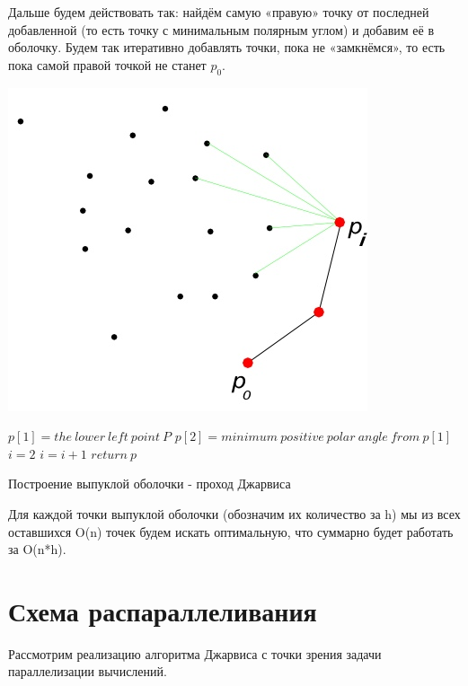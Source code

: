 \documentclass{report}
\newenvironment{myalgorithm}[1][htb]
{\renewcommand{\algorithmcfname}{Алгоритм}
\begin{algorithm}[#1]%
}{\end{algorithm}}
\begin{document}
\par Дальше будем действовать так: найдём самую «правую» точку от последней добавленной (то есть точку с минимальным полярным углом) и добавим её в оболочку. Будем так итеративно добавлять точки, пока не «замкнёмся», то есть пока самой правой точкой не станет $p_{0}$.

\begin{center}
\captionsetup {type = figure}
\includegraphics[scale=0.75]{picture.png}
\vspace{1ex}
\end{center} 

\begin{myalgorithm}[H]
\SetAlgoLined
\BlankLine
$p[1] = the\:lower\:left\:point\:P$\;
$p[2] =minimum\:positive\:polar\:angle\:from\:p[1]$\;
$i = 2$\;
\BlankLine
{} {
$i = i + 1$\;
}
$return\:p$\;
\caption{Построение выпуклой оболочки - проход Джарвиса}
\end{myalgorithm}

\par Для каждой точки выпуклой оболочки (обозначим их количество за h) мы из всех оставшихся O(n) точек будем искать оптимальную, что суммарно будет работать за O(n*h).

\newpage

\section{Схема распараллеливания}
Рассмотрим реализацию алгоритма Джарвиса с точки зрения задачи параллелизации вычислений.
\end{document}
